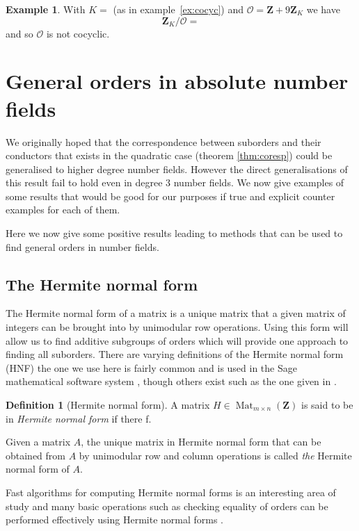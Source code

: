 \documentclass[a4paper,abstracton,bibtotoc]{scrreprt}
\theoremstyle{definition}
\newtheorem{defn}{Definition}
\newtheorem{ex}{Example}
\newcommand{\ZZ}{\mathbf{Z}}
\renewcommand{\O}{\mathcal{O}}
\DeclareMathOperator{\Mat}{Mat}
\begin{document}
\begin{ex}
\label{ex:noncocyc}
With $K = $ (as in example~\ref{ex:cocyc}) and $\O = \ZZ + 9\ZZ_K$ we have
\[
\ZZ_K/\O = 
\]
and so $\O$ is not cocyclic.
\end{ex}

\section{General orders in absolute number fields}

We originally hoped that the correspondence between suborders and their conductors that exists in the quadratic case (theorem \ref{thm:coresp}) could be generalised to higher degree number fields.
However the direct generalisations of this result fail to hold even in degree 3 number fields.
We now give examples of some results that would be good for our purposes if true and explicit counter examples for each of them.

Here we now give some positive results leading to methods that can be used to find general orders in number fields.

\subsection{The Hermite normal form}
The Hermite normal form of a matrix is a unique matrix that a given matrix of integers can be brought into by unimodular row operations.
Using this form will allow us to find additive subgroups of orders which will provide one approach to finding all suborders.
There are varying definitions of the Hermite normal form (HNF) the one we use here is fairly common and is used in the Sage mathematical software system \cite{sage}, though others exist such as the one given in \cite{cohen93}.

\begin{defn}[Hermite normal form]
A matrix $H\in\Mat_{m\times n}(\ZZ)$ is said to be in \emph{Hermite normal form} if there f.

Given a matrix $A$, the unique matrix in Hermite normal form that can be obtained from $A$ by unimodular row and column operations is called \emph{the} Hermite normal form of $A$.
\end{defn}

Fast algorithms for computing Hermite normal forms is an interesting area of study \cite{pernetstein} and many basic operations such as checking equality of orders can be performed effectively using Hermite normal forms \cite{cohen93}. 
\end{document}
